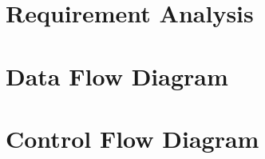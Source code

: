 \documentclass{llncs}
\begin{document}
\section{Requirement Analysis}
 
\newpage

\section{Data Flow Diagram}
 \newpage

\section{Control Flow Diagram}









\end{document}
